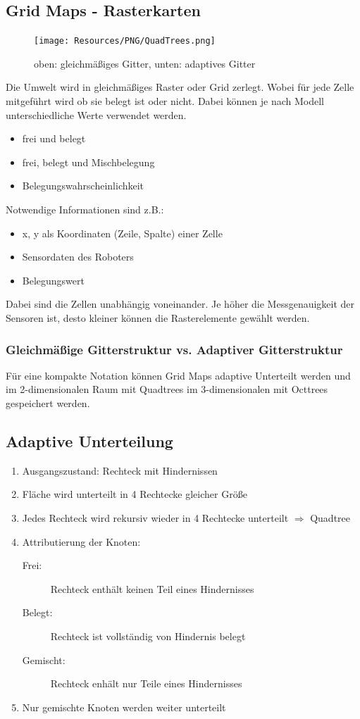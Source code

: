 \subsection{Grid Maps - Rasterkarten}
{
\begin{figure}
	\texttt{[image: Resources/PNG/QuadTrees.png]}
	\caption{oben: gleichmäßiges Gitter, unten: adaptives Gitter}
\end{figure}

Die Umwelt wird in gleichmäßiges Raster oder Grid zerlegt. Wobei für jede Zelle
mitgeführt wird ob sie belegt ist oder nicht. Dabei können je nach Modell
unterschiedliche Werte verwendet werden.
\begin{itemize}
	\item frei und belegt
	\item frei, belegt und Mischbelegung
	\item Belegungswahrscheinlichkeit
\end{itemize}
Notwendige Informationen sind z.B.:
\begin{itemize}
	\item x, y als Koordinaten (Zeile, Spalte) einer Zelle
	\item Sensordaten des Roboters
	\item Belegungswert
\end{itemize}
Dabei sind die Zellen unabhängig voneinander. Je höher die Messgenauigkeit der
Sensoren ist, desto kleiner können die Rasterelemente gewählt werden.

}

\subsubsection{Gleichmäßige Gitterstruktur vs. Adaptiver Gitterstruktur}
Für eine kompakte Notation können Grid Maps adaptive Unterteilt werden und im
2-dimensionalen Raum mit Quadtrees im 3-dimensionalen mit Octtrees gespeichert
werden.

\subsection{Adaptive Unterteilung}
\begin{enumerate}
	\item Ausgangszustand: Rechteck mit Hindernissen
	\item Fläche wird unterteilt in 4 Rechtecke gleicher Größe
	\item Jedes Rechteck wird rekursiv wieder in 4 Rechtecke unterteilt
		$\Rightarrow$ Quadtree
	\item Attributierung der Knoten:
		\begin{description}
			\item[Frei:] Rechteck enthält keinen Teil eines Hindernisses
			\item[Belegt:] Rechteck ist vollständig von Hindernis belegt
			\item[Gemischt:] Rechteck enhält nur Teile eines Hindernisses
		\end{description}
	\item Nur gemischte Knoten werden weiter unterteilt
\end{enumerate}

